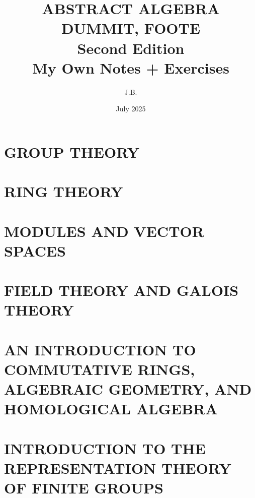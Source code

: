 \documentclass[a4paper,10pt]{book}
\title{ABSTRACT ALGEBRA\\
    \large DUMMIT, FOOTE\\
    \large Second Edition\\
	\large My Own Notes + Exercises\\
}
\author{J.B.}
\date{\small July 2025
}
\theoremstyle{plain} %
\theoremstyle{noparens}
\theoremstyle{plain} %
\begin{document}
\maketitle
{\sffamily
\tableofcontents
}

\clearpage{}

\setcounter{chapter}{0}

\part{GROUP THEORY}






\part{RING THEORY}



\part{MODULES AND VECTOR SPACES}



\part{FIELD THEORY AND GALOIS THEORY}


\part{AN INTRODUCTION TO COMMUTATIVE RINGS, ALGEBRAIC GEOMETRY, AND HOMOLOGICAL ALGEBRA}



\part{INTRODUCTION TO THE REPRESENTATION THEORY OF FINITE GROUPS}




\end{document}
